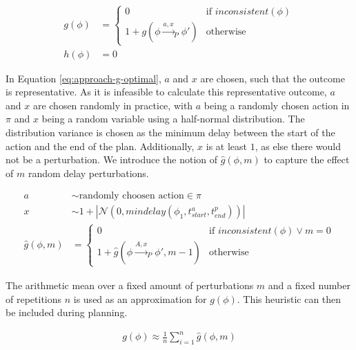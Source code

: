 \begin{align}
    g(\phi) &= \begin{cases}
        0 &\text{if } inconsistent(\phi) \\
        1 + g(\phi \xrightarrow{a,x}_P \phi') &\text{otherwise}
    \end{cases} \label{eq:approach-g-optimal}\\
    h(\phi) &= 0
\end{align}

In Equation \ref{eq:approach-g-optimal}, $a$ and $x$ are chosen, such that the outcome is representative.
As it is infeasible to calculate this representative outcome, $a$ and $x$ are chosen randomly in practice, with $a$ being a randomly chosen action in $\pi$ and $x$ being a random variable using a half-normal distribution.
The distribution variance is chosen as the minimum delay between the start of the action and the end of the plan.
Additionally, $x$ is at least $1$, as else there would not be a perturbation.
We introduce the notion of $\hat{g}(\phi,m)$ to capture the effect of $m$ random delay perturbations.

\begin{align}
    a &\sim \text{randomly choosen action} \in \pi\\
    x &\sim  1 + |\mathcal{N}(0,mindelay(\phi_1,t^a_{start},t^p_{end}))| \\
    \hat{g}(\phi,m) &= \begin{cases}
        0 &\text{if } inconsistent(\phi) \lor m = 0 \\
        1 + \hat{g}(\phi \xrightarrow{A,x}_P \phi', m - 1) &\text{otherwise}
    \end{cases}
\end{align}

The arithmetic mean over a fixed amount of perturbations $m$ and a fixed number of repetitions $n$ is used as an approximation for $g(\phi)$.
This heuristic can then be included during planning.

\begin{align}
    g(\phi) \approx \frac{1}{n} \sum_{i=1}^{n} \hat{g}(\phi,m)
\end{align}

